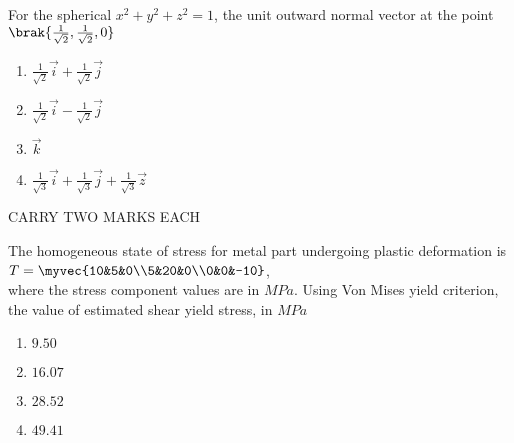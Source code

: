     \item For the spherical $x^2+y^2+z^2=1$, the unit outward normal vector at the point $\brak{\frac{1}{\sqrt{2}},\frac{1}{\sqrt{2}},0}$
    \begin{enumerate}
        \item $\frac{1}{\sqrt{2}}\Vec{i}+\frac{1}{\sqrt{2}}\Vec{j}$
        \item $\frac{1}{\sqrt{2}}\Vec{i}-\frac{1}{\sqrt{2}}\Vec{j}$
        \item $\Vec{
        k}$
        \item $\frac{1}{\sqrt{3}}\Vec{i}+\frac{1}{\sqrt{3}}\Vec{j}+\frac{1}{\sqrt{3}}\Vec{z}$
    \end{enumerate}
    CARRY TWO MARKS EACH
    \item The homogeneous state of stress for metal part undergoing plastic deformation is\\
    $T=\myvec{10&5&0\\5&20&0\\0&0&-10}$,\\
    where the stress component values are in $MPa$. Using Von Mises yield criterion, the value of estimated shear yield stress, in $MPa$
    \begin{enumerate}
        \item $9.50$
        \item $16.07$
        \item $28.52$
        \item $49.41$
    \end{enumerate}


